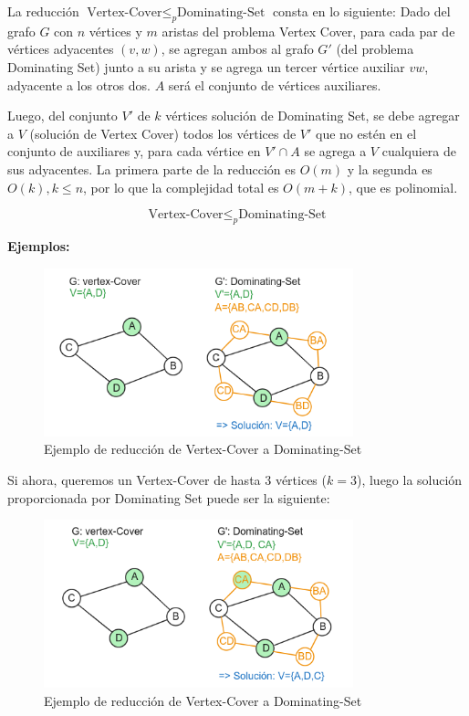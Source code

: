 La reducción $\text{Vertex-Cover} \leq _{p} \text{Dominating-Set}$ consta en lo siguiente:
Dado del grafo $G$ con $n$ vértices y $m$ aristas del problema Vertex Cover, para cada par de 
vértices adyacentes $(v,w)$, se agregan ambos al grafo $G'$ (del problema Dominating Set) junto a 
su arista y se agrega un tercer vértice auxiliar $vw$, adyacente a los otros dos. $A$ será el 
conjunto de vértices auxiliares. 

Luego, del conjunto $V'$ de $k$ vértices solución de Dominating Set, se debe agregar a $V$ (solución de Vertex Cover) todos los vértices de $V'$ que no estén en el conjunto de auxiliares y, para cada vértice en $V' \cap A$ se agrega a $V$  cualquiera de sus adyacentes. La primera parte de la reducción es $O(m)$ y la segunda es $O(k),k \leq n$, por lo que la complejidad total es $O(m+k)$, que es polinomial.

\[\text{Vertex-Cover} \leq _{p} \text{Dominating-Set}\]

\textbf{Ejemplos:} 

\begin{figure}[H]
    \centering
    \includegraphics[width=0.8\textwidth]{img/ejemplo1_VC-DS.png}
    \caption{Ejemplo de reducción de Vertex-Cover a Dominating-Set}
    \label{fig:ejemplo1_VC-DS}
\end{figure}

Si ahora, queremos un Vertex-Cover de hasta 3 vértices ($k=3$), luego la solución proporcionada por Dominating Set puede ser la siguiente:

\begin{figure}[H]
    \centering
    \includegraphics[width=0.8\textwidth]{img/ejemplo2_VC-DS.png}
    \caption{Ejemplo de reducción de Vertex-Cover a Dominating-Set}
    \label{fig:ejemplo2_VC-DS}
\end{figure}


